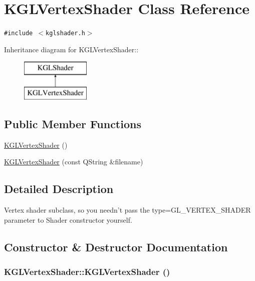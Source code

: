 \hypertarget{class_k_g_l_vertex_shader}{
\section{KGLVertexShader Class Reference}
\label{class_k_g_l_vertex_shader}
}
{\tt \#include $<$kglshader.h$>$}

Inheritance diagram for KGLVertexShader::\begin{figure}[H]
\begin{center}
\leavevmode
\includegraphics[height=2cm]{class_k_g_l_vertex_shader}
\end{center}
\end{figure}
\subsection*{Public Member Functions}
\begin{CompactItemize}
\item 
\hyperlink{class_k_g_l_vertex_shader_7d4f6727d65757daafbabb4d6b229529}{KGLVertexShader} ()
\item 
\hyperlink{class_k_g_l_vertex_shader_b344fad22cc637f30d0380372fd4a5ec}{KGLVertexShader} (const QString \&filename)
\end{CompactItemize}


\subsection{Detailed Description}
Vertex shader subclass, so you needn't pass the type=GL\_\-VERTEX\_\-SHADER parameter to Shader constructor yourself. 

\subsection{Constructor \& Destructor Documentation}
\hypertarget{class_k_g_l_vertex_shader_7d4f6727d65757daafbabb4d6b229529}{
\subsubsection[{KGLVertexShader}]{\setlength{\rightskip}{0pt plus 5cm}KGLVertexShader::KGLVertexShader ()}}
\label{class_k_g_l_vertex_shader_7d4f6727d65757daafbabb4d6b229529}


